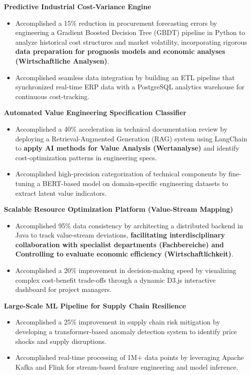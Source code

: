 \documentclass[a4paper,10pt]{article}
\begin{document}
\noindent
\textbf{Predictive Industrial Cost-Variance Engine}
\begin{itemize}
    \item Accomplished a 15\% reduction in procurement forecasting errors by engineering a Gradient Boosted Decision Tree (GBDT) pipeline in Python to analyze historical cost structures and market volatility, incorporating rigorous \textbf{data preparation for prognosis models and economic analyses (Wirtschaftliche Analysen)}.
    \item Accomplished seamless data integration by building an ETL pipeline that synchronized real-time ERP data with a PostgreSQL analytics warehouse for continuous cost-tracking.
\end{itemize}

\vspace{4pt}
\noindent
\textbf{Automated Value Engineering Specification Classifier}
\begin{itemize}
    \item Accomplished a 40\% acceleration in technical documentation review by deploying a Retrieval-Augmented Generation (RAG) system using LangChain to \textbf{apply AI methods for Value Analysis (Wertanalyse)} and identify cost-optimization patterns in engineering specs.
    \item Accomplished high-precision categorization of technical components by fine-tuning a BERT-based model on domain-specific engineering datasets to extract latent value indicators.
\end{itemize}

\vspace{4pt}
\noindent
\textbf{Scalable Resource Optimization Platform (Value-Stream Mapping)}
\begin{itemize}
    \item Accomplished 95\% data consistency by architecting a distributed backend in Java to track value-stream deviations, \textbf{facilitating interdisciplinary collaboration with specialist departments (Fachbereiche) and Controlling to evaluate economic efficiency (Wirtschaftlichkeit)}.
    \item Accomplished a 20\% improvement in decision-making speed by visualizing complex cost-benefit trade-offs through a dynamic D3.js interactive dashboard for project managers.
\end{itemize}

\vspace{4pt}
\noindent
\textbf{Large-Scale ML Pipeline for Supply Chain Resilience}
\begin{itemize}
    \item Accomplished a 25\% improvement in supply chain risk mitigation by developing a transformer-based anomaly detection system to identify price shocks and supply disruptions.
    \item Accomplished real-time processing of 1M+ data points by leveraging Apache Kafka and Flink for stream-based feature engineering and model inference.
\end{itemize}
\end{document}

